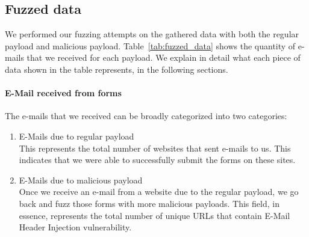 \subsection{Fuzzed data}
We performed our fuzzing attempts on the gathered data with both the regular payload and malicious payload. Table~\ref{tab:fuzzed_data} shows the quantity of e-mails that we received for each payload. We explain in detail what each piece of data shown in the table represents, in the following sections.

\paragraph{E-Mail received from forms}
The e-mails that we received can be broadly categorized into two categories:
\begin{enumerate}
	\item E-Mails due to regular payload\\
	This represents the total number of websites that sent e-mails to us. This indicates that we were able to successfully submit the forms on these sites.
	
	\item E-Mails due to malicious payload\\
    Once we receive an e-mail from a website due to the regular payload, we go back and fuzz those forms with more malicious payloads. This field, in essence, represents the total number of unique URLs that contain E-Mail Header Injection vulnerability.
\end{enumerate}



